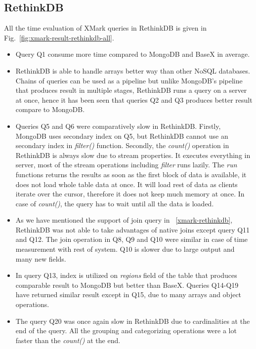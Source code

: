 \subsection{RethinkDB}
All the time evaluation of XMark queries in RethinkDB is given in Fig.~\ref{fig:xmark-result-rethinkdb-all}. 
\begin{itemize}
\item Query Q1 consume more time compared to MongoDB and BaseX in average.
 \item  
  RethinkDB is able to handle arrays better way than other NoSQL databases. Chains of queries can be used as a pipeline but unlike MongoDB's pipeline that produces result in multiple stages, RethinkDB runs a query on a server at once, hence it has been seen that queries Q2 and Q3 produces better result compare to MongoDB. 
 \item
 Queries Q5 and Q6 were comparatively slow in  RethinkDB. Firstly, MongoDB uses secondary index on Q5, but RethinkDB cannot use an secondary index in \textit{filter()} function. Secondly, the \textit{count()} operation in RethinkDB is always slow due to stream properties. It executes everything in server, most of the stream operations  including \textit{filter} runs lazily. The \textit{run} functions returns the results as soon as the first block of data is available, it does not load whole table data  at once. It will load rest of data as clients iterate over the cursor, therefore it does not keep much memory at once. In case of \textit{count()}, the query has to wait until all the data is loaded. 
 \item As we have mentioned the support of join query in ~\ref{xmark-rethinkdb}, RethinkDB was not able to take advantages of native joins except query Q11 and Q12. The join operation in Q8, Q9 and Q10 were similar in case of time measurement with rest of system. Q10 is slower due to large output and many new fields. 
 \item In query Q13, index is utilized on \textit{regions} field of the table that produces comparable result to MongoDB but better than BaseX. Queries Q14-Q19 have returned similar result except in Q15, due to many arrays and object operations. 
\item The query Q20 was once again slow in RethinkDB due to cardinalities at the end of the query. All the grouping and categorizing operations were a lot faster than the \textit{count()} at the end. 
\end{itemize}

